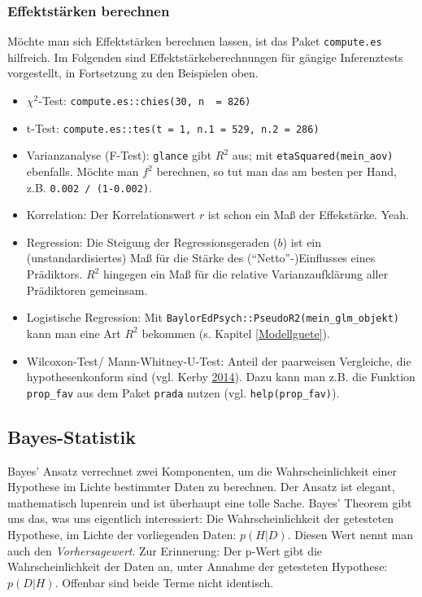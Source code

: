\documentclass[12pt,ngerman,]{book}
\providecommand{\tightlist}{%
  \setlength{\itemsep}{0pt}\setlength{\parskip}{0pt}}
\theoremstyle{definition}
\theoremstyle{definition}
\theoremstyle{remark}
\begin{document}
\subsubsection{Effektstärken berechnen}\label{effektstarken-berechnen}

Möchte man sich Effektstärken berechnen lassen, ist das Paket
\texttt{compute.es} hilfreich. Im Folgenden sind
Effektstärkeberechnungen für gängige Inferenztests vorgestellt, in
Fortsetzung zu den Beispielen oben.

\begin{itemize}
\tightlist
\item
  \(\chi^2\)-Test: \texttt{compute.es::chies(30,\ n\ \ =\ 826)}
\item
  t-Test: \texttt{compute.es::tes(t\ =\ 1,\ n.1\ =\ 529,\ n.2\ =\ 286)}
\item
  Varianzanalyse (F-Test): \texttt{glance} gibt \(R^2\) aus; mit
  \texttt{etaSquared(mein\_aov)} ebenfalls. Möchte man \(f^2\)
  berechnen, so tut man das am besten per Hand, z.B.
  \texttt{0.002\ /\ (1-0.002)}.
\item
  Korrelation: Der Korrelationswert \(r\) ist schon ein Maß der
  Effekstärke. Yeah.
\item
  Regression: Die Steigung der Regressionsgeraden (\(b\)) ist ein
  (unstandardisiertes) Maß für die Stärke des (``Netto''-)Einflusses
  eines Prädiktors. \(R^2\) hingegen ein Maß für die relative
  Varianzaufklärung aller Prädiktoren gemeinsam.
\item
  Logistische Regression: Mit
  \texttt{BaylorEdPsych::PseudoR2(mein\_glm\_objekt)} kann man eine Art
  \(R^2\) bekommen (s. Kapitel \ref{Modellguete}).
\item
  Wilcoxon-Test/ Mann-Whitney-U-Test: Anteil der paarweisen Vergleiche,
  die hypothesenkonform sind (vgl. Kerby
  \protect\hyperlink{ref-Kerby2014}{2014}). Dazu kann man z.B. die
  Funktion \texttt{prop\_fav} aus dem Paket \texttt{prada} nutzen (vgl.
  \texttt{help(prop\_fav)}).
\end{itemize}

\subsection{Bayes-Statistik}\label{bayes-statistik}

Bayes' Ansatz verrechnet zwei Komponenten, um die Wahrscheinlichkeit
einer Hypothese im Lichte bestimmter Daten zu berechnen. Der Ansatz ist
elegant, mathematisch lupenrein und ist überhaupt eine tolle Sache.
Bayes' Theorem gibt uns das, was uns eigentlich interessiert: Die
Wahrscheinlichkeit der getesteten Hypothese, im Lichte der vorliegenden
Daten: \(p(H|D)\). Diesen Wert nennt man auch den \emph{Vorhersagewert}.
Zur Erinnerung: Der p-Wert gibt die Wahrscheinlichkeit der Daten an,
unter Annahme der getesteten Hypothese: \(p(D|H)\). Offenbar sind beide
Terme nicht identisch.
\end{document}
